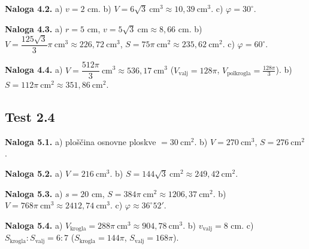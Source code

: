 \documentclass[a4paper,12pt]{article}
\theoremstyle{naloga}
\begin{document}
\textbf{Naloga 4.2.} a) $v=2$ cm.\quad
b) $V=6\sqrt3\ \text{cm}^3\approx10{,}39\ \text{cm}^3$.\quad
c) $\varphi=30^{\circ}$.

\textbf{Naloga 4.3.} a) $r=5$ cm, $v=5\sqrt3\ \text{cm}\approx8{,}66$ cm.\quad
b) $V=\dfrac{125\sqrt3}{3}\pi\ \text{cm}^3\approx226{,}72\ \text{cm}^3$, $S=75\pi\ \text{cm}^2\approx235{,}62\ \text{cm}^2$.\quad
c) $\varphi=60^{\circ}$.

\textbf{Naloga 4.4.} a) $V=\dfrac{512\pi}{3}\ \text{cm}^3\approx536{,}17\ \text{cm}^3$ ($V_{\text{valj}}=128\pi$, $V_{\text{polkrogla}}=\tfrac{128\pi}{3}$).\quad
b) $S=112\pi\ \text{cm}^2\approx351{,}86\ \text{cm}^2$.

\subsection*{Test 2.4}
\textbf{Naloga 5.1.} a) ploščina osnovne ploskve $=30\ \text{cm}^2$.\quad
b) $V=270\ \text{cm}^3$, $S=276\ \text{cm}^2$.

\textbf{Naloga 5.2.} a) $V=216\ \text{cm}^3$.\quad
b) $S=144\sqrt3\ \text{cm}^2\approx249{,}42\ \text{cm}^2$.

\textbf{Naloga 5.3.} a) $s=20$ cm, $S=384\pi\ \text{cm}^2\approx1206{,}37\ \text{cm}^2$.\quad
b) $V=768\pi\ \text{cm}^3\approx2412{,}74\ \text{cm}^3$.\quad
c) $\varphi\approx36^{\circ}52'$.

\textbf{Naloga 5.4.} a) $V_{\text{krogla}}=288\pi\ \text{cm}^3\approx904{,}78\ \text{cm}^3$.\quad
b) $v_{\text{valj}}=8$ cm.\quad
c) $S_{\text{krogla}}:S_{\text{valj}}=6:7$ ($S_{\text{krogla}}=144\pi$, $S_{\text{valj}}=168\pi$).
\end{document}
